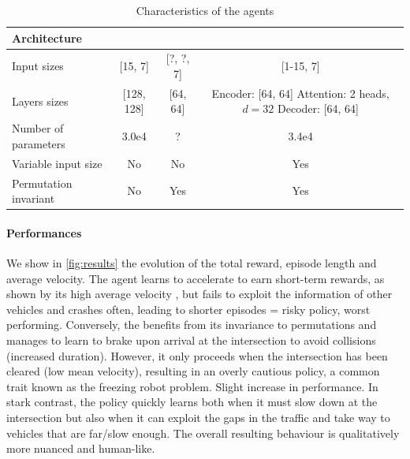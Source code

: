 \documentclass{article}
\begin{document}
{\begin{table}[tp]
	\centering
	\begin{threeparttable}
		\caption{Characteristics of the agents}
		\label{tab:agents}
		\begin{tabular}{lccc}
			\toprule
			Architecture & \MLPC & \MLPG & \EgoAtt \\
			\midrule 
			Input sizes & [15, 7] & [?, ?, 7] & [1-15, 7] \\
			Layers sizes & [128, 128] &  [64, 64] & \makecell[l]{Encoder: [64, 64] \\Attention: 2 heads, $d=32$ \\ Decoder: [64, 64]} \\
			Number of parameters & 3.0e4 & ? & 3.4e4 \\
			Variable input size & No & No & Yes  \\
			Permutation invariant & No & Yes & Yes \\
			\bottomrule
		\end{tabular}
	\end{threeparttable}
\end{table}

\paragraph{Performances}

We show in \autoref{fig:results} the evolution of the total reward, episode length and average velocity.
The \MLPC agent learns to accelerate to earn short-term rewards, as shown by its high average velocity , but fails to exploit the information of other vehicles and crashes often, leading to shorter episodes = risky policy, worst performing.
Conversely, the \MLPG benefits from its invariance to permutations and manages to learn to brake upon arrival at the intersection to avoid collisions (increased duration). However, it only proceeds when the intersection has been cleared (low mean velocity), resulting in an overly cautious policy, a common trait known as the freezing robot problem. Slight increase in performance.
In stark contrast, the \EgoAtt policy quickly learns both when it must slow down at the intersection but also when it can exploit the gaps in the traffic and take way to vehicles that are far/slow enough. The overall resulting behaviour is qualitatively more nuanced and human-like.

}
\end{document}
